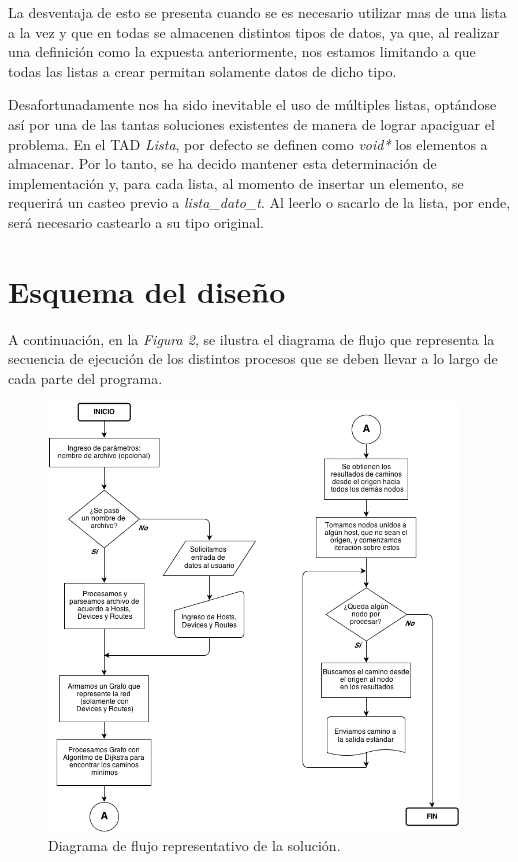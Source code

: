 \documentclass{article}
\begin{document}
	La desventaja de esto se presenta cuando se es necesario utilizar mas de una lista a la vez y que en todas se almacenen distintos tipos de datos, ya que, al realizar una definición como la expuesta anteriormente, nos estamos limitando a que todas las listas a crear permitan solamente datos de dicho tipo. 
	\par
	Desafortunadamente nos ha sido inevitable el uso de múltiples listas, optándose así por una de las tantas soluciones existentes de manera de lograr apaciguar el problema. En el TAD \textit{Lista}, por defecto se definen como \textit{void*} los elementos a almacenar. Por lo tanto, se ha decido mantener esta determinación de implementación y, para cada lista, al momento de insertar un elemento, se requerirá un casteo previo a \textit{lista\_dato\_t}. Al leerlo o sacarlo de la lista, por ende, será necesario castearlo a su tipo original.
\bigskip




\section{Esquema del diseño}

	A continuación, en la \textit{Figura 2}, se ilustra el diagrama de flujo que representa la secuencia de ejecución de los distintos procesos que se deben llevar a lo largo de cada parte del programa.

\newpage
\begin{figure}[h]
	\centering
	\includegraphics[width=0.968976\textwidth]{images/diagrama02.png}
	\medskip
	\caption{Diagrama de flujo representativo de la solución.}
\end{figure}
\end{document}
